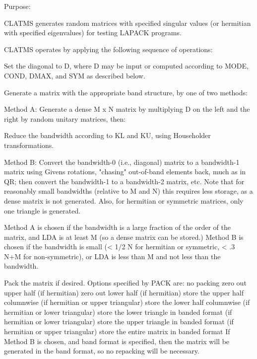 \begin{DoxyParagraph}{Purpose\+: }
\begin{DoxyVerb}    CLATMS generates random matrices with specified singular values
    (or hermitian with specified eigenvalues)
    for testing LAPACK programs.

    CLATMS operates by applying the following sequence of
    operations:

      Set the diagonal to D, where D may be input or
         computed according to MODE, COND, DMAX, and SYM
         as described below.

      Generate a matrix with the appropriate band structure, by one
         of two methods:

      Method A:
          Generate a dense M x N matrix by multiplying D on the left
              and the right by random unitary matrices, then:

          Reduce the bandwidth according to KL and KU, using
              Householder transformations.

      Method B:
          Convert the bandwidth-0 (i.e., diagonal) matrix to a
              bandwidth-1 matrix using Givens rotations, "chasing"
              out-of-band elements back, much as in QR; then convert
              the bandwidth-1 to a bandwidth-2 matrix, etc.  Note
              that for reasonably small bandwidths (relative to M and
              N) this requires less storage, as a dense matrix is not
              generated.  Also, for hermitian or symmetric matrices,
              only one triangle is generated.

      Method A is chosen if the bandwidth is a large fraction of the
          order of the matrix, and LDA is at least M (so a dense
          matrix can be stored.)  Method B is chosen if the bandwidth
          is small (< 1/2 N for hermitian or symmetric, < .3 N+M for
          non-symmetric), or LDA is less than M and not less than the
          bandwidth.

      Pack the matrix if desired. Options specified by PACK are:
         no packing
         zero out upper half (if hermitian)
         zero out lower half (if hermitian)
         store the upper half columnwise (if hermitian or upper
               triangular)
         store the lower half columnwise (if hermitian or lower
               triangular)
         store the lower triangle in banded format (if hermitian or
               lower triangular)
         store the upper triangle in banded format (if hermitian or
               upper triangular)
         store the entire matrix in banded format
      If Method B is chosen, and band format is specified, then the
         matrix will be generated in the band format, so no repacking
         will be necessary.\end{DoxyVerb}
 
\end{DoxyParagraph}

